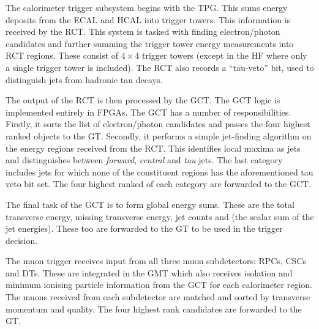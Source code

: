The calorimeter trigger subsystem begins with the \ac{TPG}. This sums energy
deposits from the \ac{ECAL} and \ac{HCAL} into trigger towers. This information
is received by the \ac{RCT}. This system is tasked with finding electron/photon
candidates and further summing the trigger tower energy measurements into
\ac{RCT} regions. These consist of $4\times 4$ trigger towers (except in the
\ac{HF} where only a single trigger tower is included). The \ac{RCT} also
records a ``tau-veto'' bit, used to distinguish jets from hadronic tau decays.

The output of the \ac{RCT} is then processed by the \ac{GCT}. The \ac{GCT} logic
is implemented entirely in \acp{FPGA}. The \ac{GCT} has a number of
responsibilities. Firstly, it sorts the list of electron/photon candidates and
passes the four highest ranked objects to the \ac{GT}. Secondly, it
performs a simple jet-finding algorithm on the energy regions received from the
\ac{RCT}. This identifies local maxima as jets and distinguishes between
\emph{forward}, \emph{central} and \emph{tau} jets. The last category includes
jets for which none of the constituent regions has the aforementioned tau veto
bit set. The four highest ranked of each category are forwarded to the \ac{GCT}.

The final task of the \ac{GCT} is to form global energy sums. These are the
total transverse energy, missing transverse energy, jet counts and \HT (the
scalar sum of the jet energies). These too are forwarded to the \ac{GT} to be
used in the trigger decision.

The muon trigger receives input from all three muon subdetectors: \acp{RPC},
\acp{CSC} and \acp{DT}. These are integrated in the \ac{GMT} which also receives
isolation and minimum ionising particle information from the \ac{GCT} for each
calorimeter region. The muons received from each subdetector are matched and
sorted by transverse momentum and quality. The four highest rank candidates are
forwarded to the \ac{GT}.
